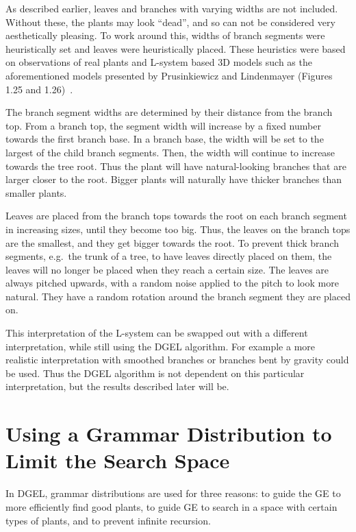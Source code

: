 As described earlier, leaves and branches with varying widths are not included.
Without these, the plants may look ``dead'', and so can not be considered very aesthetically pleasing.
To work around this, widths of \glspl{branch segment} were heuristically set and leaves were heuristically placed.
These heuristics were based on observations of real plants and \gls{L-system} based 3D models such as the aforementioned models presented by Prusinkiewicz and Lindenmayer (Figures 1.25 and 1.26)~\cite{2012Prusinkiewicz}.

The \gls{branch segment} widths are determined by their distance from the branch top.
From a branch top, the segment width will increase by a fixed number towards the first \gls{branch base}.
In a \gls{branch base}, the width will be set to the largest of the child \glspl{branch segment}.
Then, the width will continue to increase towards the tree root.
Thus the plant will have natural-looking branches that are larger closer to the root.
Bigger plants will naturally have thicker branches than smaller plants.

Leaves are placed from the branch tops towards the root on each \gls{branch segment} in increasing sizes, until they become too big.
Thus, the leaves on the branch tops are the smallest, and they get bigger towards the root.
To prevent thick \glspl{branch segment}, e.g.\ the trunk of a tree, to have leaves directly placed on them, the leaves will no longer be placed when they reach a certain size.
The leaves are always pitched upwards, with a random noise applied to the pitch to look more natural.
They have a random rotation around the \gls{branch segment} they are placed on.

This interpretation of the \gls{L-system} can be swapped out with a different interpretation, while still using the \gls{DGEL} algorithm.
For example a more realistic interpretation with smoothed branches or branches bent by gravity could be used.
Thus the \gls{DGEL} algorithm is not dependent on this particular interpretation, but the results described later will be.

\section{Using a Grammar Distribution to Limit the Search Space}
In \gls{DGEL}, grammar distributions are used for three reasons: to guide the \gls{GE} to more efficiently find good plants, to guide \gls{GE} to search in a space with certain types of plants, and to prevent infinite recursion.


